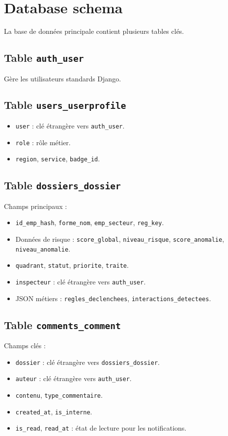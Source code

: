 \documentclass[12pt,a4paper]{article}
\begin{document}
\section{Database schema}
La base de données principale contient plusieurs tables clés.

\subsection{Table \texttt{auth_user}}
Gère les utilisateurs standards Django.

\subsection{Table \texttt{users_userprofile}}
\begin{itemize}
    \item \texttt{user} : clé étrangère vers \texttt{auth_user}.
    \item \texttt{role} : rôle métier.
    \item \texttt{region}, \texttt{service}, \texttt{badge_id}.
\end{itemize}

\subsection{Table \texttt{dossiers_dossier}}
Champs principaux :
\begin{itemize}
    \item \texttt{id_emp_hash}, \texttt{forme_nom}, \texttt{emp_secteur}, \texttt{reg_key}.
    \item Données de risque : \texttt{score_global}, \texttt{niveau_risque}, \texttt{score_anomalie}, \texttt{niveau_anomalie}.
    \item \texttt{quadrant}, \texttt{statut}, \texttt{priorite}, \texttt{traite}.
    \item \texttt{inspecteur} : clé étrangère vers \texttt{auth_user}.
    \item JSON métiers : \texttt{regles_declenchees}, \texttt{interactions_detectees}.
\end{itemize}

\subsection{Table \texttt{comments_comment}}
Champs clés :
\begin{itemize}
    \item \texttt{dossier} : clé étrangère vers \texttt{dossiers_dossier}.
    \item \texttt{auteur} : clé étrangère vers \texttt{auth_user}.
    \item \texttt{contenu}, \texttt{type_commentaire}.
    \item \texttt{created_at}, \texttt{is_interne}.
    \item \texttt{is_read}, \texttt{read_at} : état de lecture pour les notifications.
\end{itemize}
\end{document}
